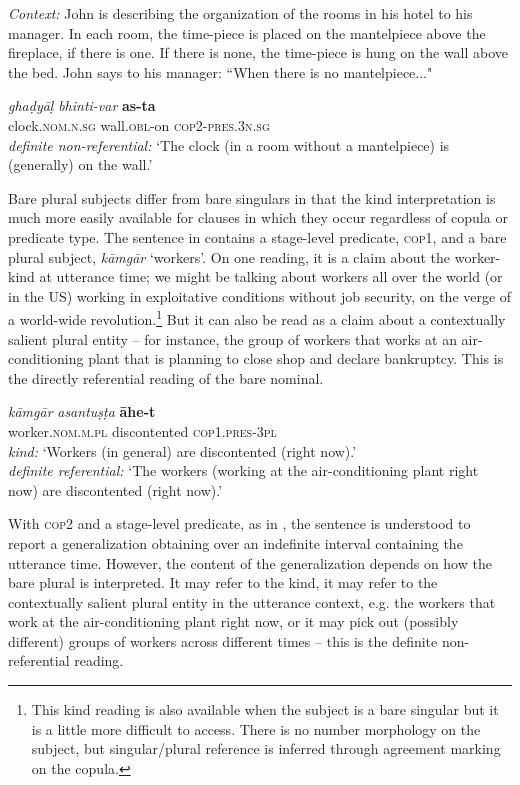 \documentclass[output=paper,hidelinks]{langscibook}
\begin{document}
\begin{exe}
\begin{xlist}
\ea \textit{Context:} John is describing the organization of the rooms in his hotel to his manager. In each room, the time-piece is placed on the mantelpiece above the fireplace, if there is one. If there is none, the time-piece is hung on the wall above the bed. John says to his manager: ``When there is no mantelpiece..."
 
\gll \emph{ghaḍyāḷ} \emph{bhinti-var} \textbf{as-ta}\\
clock.\textsc{nom.n.sg} wall.\textsc{obl}-on \textsc{cop2-pres.3n.sg}\\
\glt \emph{definite non-referential:} `The clock (in a room without a mantelpiece) is (generally) on the wall.'
\z
{}

Bare plural subjects differ from bare singulars in that the kind interpretation is much more easily available for clauses in which they occur regardless of copula or predicate type. The sentence in  contains a stage-level predicate, \textsc{cop1}, and a bare plural subject, \emph{kāmgār} `workers'. On one reading, it is a claim about the worker-kind at utterance time; we might be talking about workers all over the world (or in the US) working in exploitative conditions without job security, on the verge of a world-wide revolution.\footnote{This kind reading is also available when the subject is a bare singular but it is a little more difficult to access. There is no number morphology on the subject, but singular/plural reference is inferred through agreement marking on the copula.} But it can also be read as a claim about a contextually salient plural entity -- for instance, the group of workers that works at an air-conditioning plant that is planning to close shop and declare bankruptcy. This is the directly referential reading of the bare nominal.

\ea
\gll \emph{kāmgār} \emph{asantu\d{s}ṭa} \textbf{āhe-t}\\
worker.\textsc{nom.m.pl} discontented \textsc{cop1.pres-3pl}\\
\glt \emph{kind:} `Workers (in general) are discontented (right now).'\\
\emph{definite referential:} `The workers (working at the air-conditioning plant right now) are discontented (right now).' \label{workers1}
\z
{}

With \textsc{cop2} and a stage-level predicate, as in , the sentence is understood to report a generalization obtaining over an indefinite interval containing the utterance time. However, the content of the generalization depends on how the bare plural is interpreted. It may refer to the kind, it may refer to the contextually salient plural entity in the utterance context, e.g. the workers that work at the air-conditioning plant right now, or it may pick out (possibly different) groups of workers across different times -- this is the definite non-referential reading.\largerpage[-2]


\end{xlist}
\end{exe}
\end{document}
